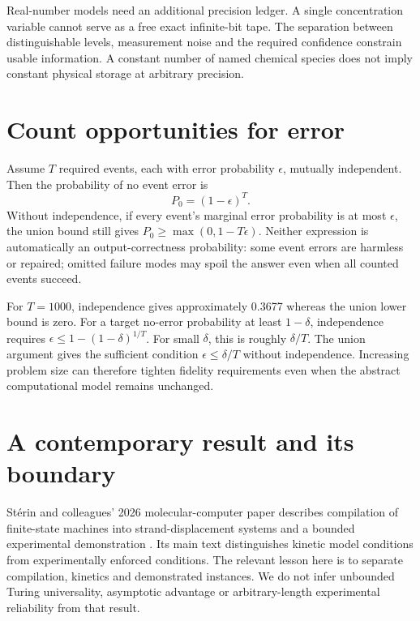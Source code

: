 Real-number models need an additional precision ledger. A single concentration
variable cannot serve as a free exact infinite-bit tape. The separation
between distinguishable levels, measurement noise and the required confidence
constrain usable information. A constant number of named chemical species
does not imply constant physical storage at arbitrary precision.

\section{Count opportunities for error}
Assume $T$ required events, each with error probability $\epsilon$, mutually
independent. Then the probability of no event error is
\begin{equation}
 P_0=(1-\epsilon)^T.
\end{equation}
Without independence, if every event's marginal error probability is at most
$\epsilon$, the union bound still gives $P_0\geq\max(0,1-T\epsilon)$.
Neither expression is automatically an output-correctness probability:
some event errors are harmless or repaired; omitted failure modes may spoil
the answer even when all counted events succeed.


For $T=1000$, independence gives approximately 0.3677 whereas the union
lower bound is zero. For a target no-error probability at least $1-\delta$,
independence requires $\epsilon\leq1-(1-\delta)^{1/T}$.
For small $\delta$, this is roughly $\delta/T$. The union argument gives
the sufficient condition $\epsilon\leq\delta/T$ without independence.
Increasing problem size can therefore tighten fidelity requirements even
when the abstract computational model remains unchanged.

\section{A contemporary result and its boundary}
Stérin and colleagues' 2026 molecular-computer paper describes compilation of
finite-state machines into strand-displacement systems and a bounded
experimental demonstration \cite{sterin}. Its main text distinguishes kinetic
model conditions from experimentally enforced conditions. The relevant lesson
here is to separate compilation, kinetics and demonstrated instances. We do
not infer unbounded Turing universality, asymptotic advantage or arbitrary-length
experimental reliability from that result.

